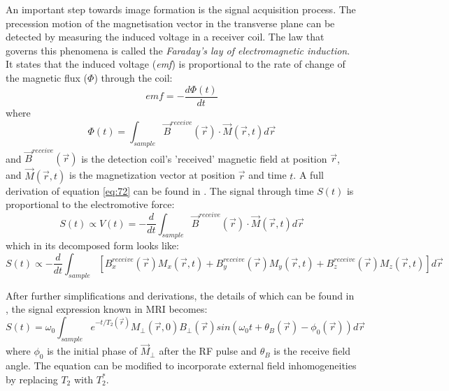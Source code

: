 An important step towards image formation is the signal acquisition process. 
The precession motion of the magnetisation vector in the transverse plane can be detected by measuring the induced voltage in a receiver coil. 
The law that governs this phenomena is called the \textit{Faraday's lay of electromagnetic induction}.
It states that the induced voltage (\textit{emf}) is proportional to the rate of change of the magnetic flux ($\Phi$) through the coil:
\begin{equation} \label{eq:71}
    emf = - \frac{d \Phi(t)}{dt}
\end{equation}
where 
\begin{equation}\label{eq:72}
    \Phi(t) = \int_{sample} \vec{B}^{receive}(\vec{r}) \cdot \vec{M}(\vec{r}, t) d\vec{r}
\end{equation}
and $\vec{B}^{receive}(\vec{r})$ is the detection coil's 'received' magnetic field at position $\vec{r}$, and $\vec{M}(\vec{r}, t)$ is the magnetization vector at position $\vec{r}$ and time $t$.
A full derivation of equation \ref{eq:72} can be found in \cite{Haacke1999}. 
The signal through time $S(t)$ is proportional to the electromotive force:
\begin{equation}\label{eq:714}
    S(t) \propto V(t) = - \frac{d }{d t} \int_{sample} \vec{B}^{receive}(\vec{r}) \cdot \vec{M}(\vec{r}, t) d\vec{r}
\end{equation}
which in its decomposed form looks like:
\begin{equation}
    S(t) \propto - \frac{d}{dt} 
    \int_{sample}
          [B_x^{receive} (\vec{r}) M_x (\vec{r}, t) + 
          B_y^{receive} (\vec{r}) M_y (\vec{r}, t) + 
          B_z^{receive} (\vec{r}) M_z (\vec{r}, t)]  d\vec{r}
\end{equation}

After further simplifications and derivations, the details of which can be found in \cite{Haacke1999}, the signal expression known in MRI becomes:
\begin{equation}
    S(t) =
        \omega_0 \int_{sample} e^{-t/T_2(\vec{r})} M_{\perp}(\vec{r},0) 
            B_{\perp}(\vec{r}) sin(\omega_0 t + \theta_B(\vec{r}) - \phi_0(\vec{r})) d\vec{r}
\end{equation}
where $\phi_0$ is the initial phase of $\vec{M}_{\perp}$ after the RF pulse 
and $\theta_B$ is the receive field angle.
The equation can be modified to incorporate external field inhomogeneities by replacing $T_2$ with $T_2^*$.

\hfill

